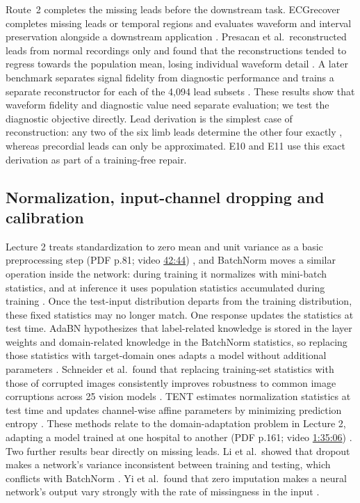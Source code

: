Route~2 completes the missing leads before the downstream task. ECGrecover completes missing leads or temporal regions and evaluates waveform and interval preservation alongside a downstream application \citep{lence2025ecgrecover}. Presacan et al.\ reconstructed leads from normal recordings only and found that the reconstructions tended to regress towards the population mean, losing individual waveform detail \citep{presacan2025reconstruction}. A later benchmark separates signal fidelity from diagnostic performance and trains a separate reconstructor for each of the 4,094 lead subsets \citep{zhang2026subsetbenchmark}. These results show that waveform fidelity and diagnostic value need separate evaluation; we test the diagnostic objective directly. Lead derivation is the simplest case of reconstruction: any two of the six limb leads determine the other four exactly \citep{reyna2022issues}, whereas precordial leads can only be approximated. E10 and E11 use this exact derivation as part of a training-free repair.

\subsection{Normalization, input-channel dropping and calibration}

Lecture 2 treats standardization to zero mean and unit variance as a basic preprocessing step (PDF p.81; video \href{https://youtu.be/Ki2h4rNHuSk?t=2564}{42:44}) \citep{md6329lecture02}, and BatchNorm moves a similar operation inside the network: during training it normalizes with mini-batch statistics, and at inference it uses population statistics accumulated during training \citep[p.4]{ioffe2015batchnorm}. Once the test-input distribution departs from the training distribution, these fixed statistics may no longer match. One response updates the statistics at test time. AdaBN hypothesizes that label-related knowledge is stored in the layer weights and domain-related knowledge in the BatchNorm statistics, so replacing those statistics with target-domain ones adapts a model without additional parameters \citep{li2018adabn}. Schneider et al.\ found that replacing training-set statistics with those of corrupted images consistently improves robustness to common image corruptions across 25 vision models \citep{schneider2020covariate}. TENT estimates normalization statistics at test time and updates channel-wise affine parameters by minimizing prediction entropy \citep{wang2021tent}. These methods relate to the domain-adaptation problem in Lecture 2, adapting a model trained at one hospital to another (PDF p.161; video \href{https://youtu.be/Ki2h4rNHuSk?t=5706}{1:35:06}) \citep{md6329lecture02}. Two further results bear directly on missing leads. Li et al.\ showed that dropout makes a network's variance inconsistent between training and testing, which conflicts with BatchNorm \citep{li2019variance}. Yi et al.\ found that zero imputation makes a neural network's output vary strongly with the rate of missingness in the input \citep{yi2020zeroimputation}.

